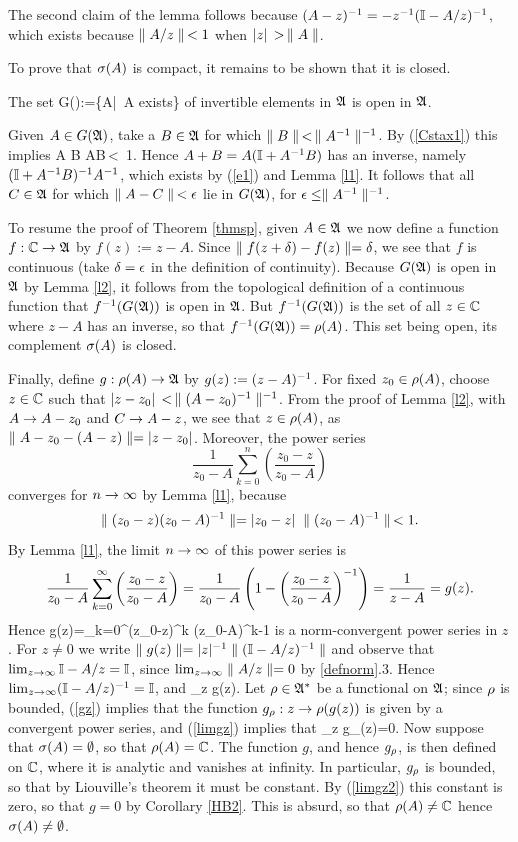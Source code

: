 The second claim of the lemma follows because $(A-z)^{-1}
 =-z^{-1}({\Bbb I}-A/z)^{-1}$, which exists because $\parallel A/z\parallel\,<1$ when
 $|z|\,>\,\parallel A\parallel$.  \enp

To prove that $\sigma(A)$ is compact, it remains to be shown that it is
 closed.
\begin{Lemma}
The set \be G(\A):=\{A\in\A|\, A\inv\: {\rm exists}\}  \ee of
invertible elements in ${\frak A}$ is open in ${\frak A}$. \end{Lemma}

Given $A\in G({\frak A})$, take a $B\in{\frak A}$ for which $\parallel B\parallel\,<\, \parallel
A^{-1}\parallel^{-1}$.  By (\ref{Cstax1}) this implies \be \n A\inv
B\n\,\leq\,\n A\inv\n\;\n B\n\,<\, 1.  \ee Hence
$A+B=A({\Bbb I}+A^{-1} B)$ has an inverse, namely $({\Bbb I}+A^{-1} B)^{-1} A^{-1}$,
which exists by (\ref{e1}) and Lemma \ref{l1}.  It follows that all
$C\in{\frak A}$ for which $\parallel A-C\parallel\,<\epsilon$ lie in $G({\frak A})$, for $\epsilon\leq \parallel
A^{-1}\parallel^{-1}$.\enp

To resume the proof of Theorem \ref{thmsp}, given $A\in{\frak A}$ we now
define a function $f:{\Bbb C}\rightarrow{\frak A}$ by $f(z):=z-A$. Since $\parallel
f(z+\delta)-f(z)\parallel=\delta$, we see that $f$ is continuous (take $\delta=\epsilon$ in
the definition of continuity). Because $G({\frak A})$ is open in ${\frak A}$ by
Lemma \ref{l2}, it follows from the topological definition of a
continuous function that $f^{-1}(G({\frak A}))$ is open in ${\frak A}$. But
$f^{-1}(G({\frak A}))$ is the set of all $z\in{\Bbb C}$ where $z-A$ has an inverse,
so that $f^{-1}(G({\frak A}))=\rho(A)$. This set being open, its complement
$\sigma(A)$ is closed.

Finally, define $g:\rho(A)\rightarrow{\frak A}$ by $g(z):=(z-A)^{-1}$. For fixed
$z_0\in\rho(A)$, choose $z\in{\Bbb C}$ such that $|z-z_0|\, <\,
\parallel(A-z_0)^{-1}\parallel^{-1}$.  From the proof of Lemma \ref{l2}, with $A\rightarrow
A-z_0$ and $C\rightarrow A-z$, we see that $z\in\rho(A)$, as $\parallel
A-z_0-(A-z)\parallel=|z-z_0|$. Moreover, the power series
$$
\frac{1}{z_0-A}\sum_{k=0}^{n}\left(\frac{z_0-z}{z_0-A}\right)
$$ 
converges for $n\rightarrow\infty$ by Lemma \ref{l1}, because
$$
\parallel (z_0-z)(z_0-A)^{-1}\parallel=|z_0-z|\;\parallel(z_0-A)^{-1}\parallel\,<1.
$$
By Lemma \ref{l1}, the limit $n\rightarrow\infty$ of this power series is
$$
\frac{1}{z_0-A}\sum_{k=0}^{\infty}\left(\frac{z_0-z}{z_0-A}\right)=
\frac{1}{z_0-A}\left( 1-\left(\frac{z_0-z}{z_0-A}\right)^{-1}\right)=
\frac{1}{z-A}=g(z).
$$
Hence \be g(z)=\sum_{k=0}^{\infty}(z_0-z)^k (z_0-A)^{k-1}  \ee
is a norm-convergent power series in $z$.  For $z\neq 0$ we write $\parallel
g(z)\parallel=|z|^{-1}\parallel({\Bbb I}-A/z)^{-1}\parallel$ and observe that $\lim_{z\rightarrow\infty}
{\Bbb I}-A/z={\Bbb I}$, since $\lim_{z\rightarrow\infty} \parallel A/z\parallel=0$ by
\ref{defnorm}.3. Hence $\lim_{z\rightarrow\infty}({\Bbb I}-A/z)^{-1}={\Bbb I}$, and \be
\lim_{z\raw\infty} \n g(z).  \ee Let $\rho\in{\frak A}^*$ be a
functional on ${\frak A}$; since $\rho$ is bounded, (\ref{gz}) implies that
the function $g_{\rho}:z\rightarrow\rho(g(z))$ is given by a convergent power
series, and (\ref{limgz}) implies that \be \lim_{z\raw\infty}
g_{\rh}(z)=0.  \ee Now suppose that $\sigma(A)=\emptyset$, so
that $\rho(A)={\Bbb C}$. The function $g$, and hence $g_{\rho}$, is then
defined on ${\Bbb C}$, where it is analytic and vanishes at infinity.  In
particular, $g_{\rho}$ is bounded, so that by Liouville's theorem it
must be constant.  By (\ref{limgz2}) this constant is zero, so that
$g=0$ by Corollary \ref{HB2}. This is absurd, so that $\rho(A)\neq{\Bbb C}$
hence $\sigma(A)\neq\emptyset$.  \enp

